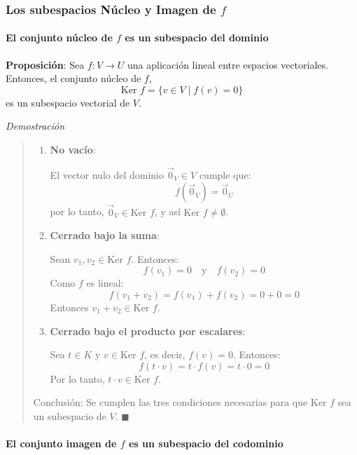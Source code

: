 \subsubsection{Los subespacios Núcleo y Imagen de \(f\)}

\paragraph{El conjunto núcleo de \(f\) es un subespacio del dominio}

\textbf{Proposición}: Sea \(f: V \to U\) una aplicación lineal entre espacios vectoriales. Entonces, el conjunto núcleo de \(f\),
\[
\text{Ker } f = \{ v \in V \mid f(v) = 0 \}
\]
es un subespacio vectorial de \(V\).

\textit{Demostración}
\begin{quote}
  \begin{enumerate}
    \item \textbf{No vacío}:
    
    El vector nulo del dominio \(\vec{0}_V \in V\) cumple que:
      \[
      f(\vec{0}_V) = \vec{0}_U
      \]
    por lo tanto, \(\vec{0}_V \in \text{Ker } f\), y así \(\text{Ker } f \ne \emptyset\).
  
    \item \textbf{Cerrado bajo la suma}:
    
      Sean \(v_1, v_2 \in \text{Ker } f\). Entonces:
     \[
     f(v_1) = 0 \quad \text{y} \quad f(v_2) = 0
     \]
     Como \(f\) es lineal:
     \[
     f(v_1 + v_2) = f(v_1) + f(v_2) = 0 + 0 = 0
     \]
     Entonces \(v_1 + v_2 \in \text{Ker } f\).
  
    \item \textbf{Cerrado bajo el producto por escalares}:
     
      Sea \(t \in K\) y \(v \in \text{Ker } f\), es decir, \(f(v) = 0\). Entonces:
     \[
     f(t \cdot v) = t \cdot f(v) = t \cdot 0 = 0
     \]
     Por lo tanto, \(t \cdot v \in \text{Ker } f\).
  \end{enumerate}
  
  Conclusión: Se cumplen las tres condiciones necesarias para que \(\text{Ker } f\) sea un subespacio de \(V\).
  \(\blacksquare\)
\end{quote}

\paragraph{El conjunto imagen de \(f\) es un subespacio del codominio}


